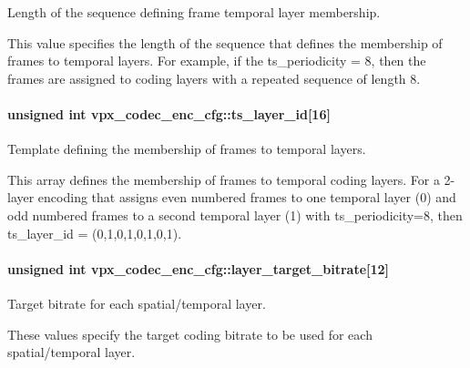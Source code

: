 Length of the sequence defining frame temporal layer membership. 

This value specifies the length of the sequence that defines the membership of frames to temporal layers. For example, if the ts\+\_\+periodicity = 8, then the frames are assigned to coding layers with a repeated sequence of length 8. 
\paragraph[{\texorpdfstring{ts\+\_\+layer\+\_\+id}{ts_layer_id}}]{\setlength{\rightskip}{0pt plus 5cm}unsigned int vpx\+\_\+codec\+\_\+enc\+\_\+cfg\+::ts\+\_\+layer\+\_\+id\mbox{[}16\mbox{]}}\hypertarget{structvpx__codec__enc__cfg_a4d105d2470dbfb7210b33d298f1cf1f6}{}\label{structvpx__codec__enc__cfg_a4d105d2470dbfb7210b33d298f1cf1f6}


Template defining the membership of frames to temporal layers. 

This array defines the membership of frames to temporal coding layers. For a 2-\/layer encoding that assigns even numbered frames to one temporal layer (0) and odd numbered frames to a second temporal layer (1) with ts\+\_\+periodicity=8, then ts\+\_\+layer\+\_\+id = (0,1,0,1,0,1,0,1). 
\paragraph[{\texorpdfstring{layer\+\_\+target\+\_\+bitrate}{layer_target_bitrate}}]{\setlength{\rightskip}{0pt plus 5cm}unsigned int vpx\+\_\+codec\+\_\+enc\+\_\+cfg\+::layer\+\_\+target\+\_\+bitrate\mbox{[}12\mbox{]}}\hypertarget{structvpx__codec__enc__cfg_a3f6b4c8aea7a713c51ad5d44e3552b1f}{}\label{structvpx__codec__enc__cfg_a3f6b4c8aea7a713c51ad5d44e3552b1f}


Target bitrate for each spatial/temporal layer. 

These values specify the target coding bitrate to be used for each spatial/temporal layer. 

